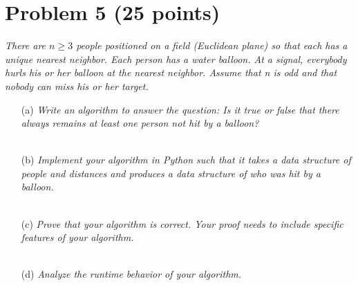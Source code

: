 \documentclass[12pt]{article}
\begin{document}
{%
\section*{{\selectfont Problem 5 (25 points)}}\vspace{-10mm}
\textsl{There are $n \geq 3$ people positioned on a field (Euclidean plane) so that each has a unique nearest neighbor. Each person has a water balloon. At a signal, everybody hurls his or her balloon at the nearest neighbor. Assume that n is odd and that nobody can miss his or her target.}
\begin{enumerate}
\item[(a)]\textsl{Write an algorithm to answer the question: Is it true or false that there always remains at least one person not hit by a balloon?}\\ \\
\item[(b)]\textsl{Implement your algorithm in Python such that it takes a data structure of people and distances and produces a data structure of who was hit by a balloon.}\\ \\
\item[(c)]\textsl{Prove that your algorithm is correct. Your proof needs to include specific features of your algorithm.}\\ \\
\item[(d)]\textsl{Analyze the runtime behavior of your algorithm.}\\ \\
\end{enumerate}
}
\end{document}
